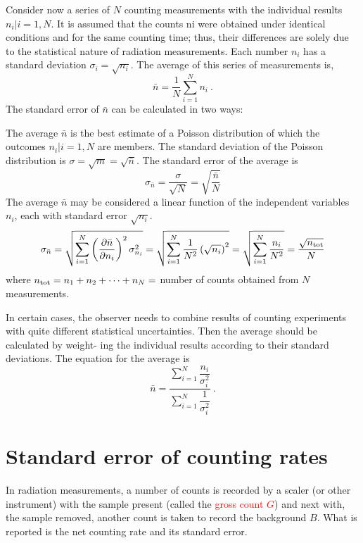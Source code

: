 \documentclass[12pt,a4paper]{article}
\begin{document}
Consider now a series of $N$ counting measurements with the individual results $n_i|i = 1, N$. It is assumed that the counts ni were obtained under identical conditions and for the same counting time; thus, their differences are solely due to the statistical nature of radiation measurements. Each number $n_i$ has a standard deviation $\sigma_i = \sqrt{n_i}$. The average of this series of measurements is,
\begin{equation}
\bar{n} = \dfrac{1}{N} \sum_{i=1}^N n_i ~.
\end{equation}
The standard error of $\bar{n}$ can be calculated in two ways:

The average $\bar{n}$ is the best estimate of a Poisson distribution of which the outcomes $n_i|i = 1, N$ are members. The standard deviation of the Poisson distribution is $\sigma = \sqrt{m} = \sqrt{\bar{n}}$. The standard error of the average is
\begin{equation}
\sigma_{\bar{n}} = \dfrac{\sigma}{\sqrt{N} } =  \sqrt{\dfrac{\bar{n} }{N} }
\end{equation}
The average $\bar{n}$ may be considered a linear function of the independent variables $n_i$, each with standard error
$\sqrt{n_i}$.
\begin{equation}
\sigma_{\bar{n}} = \sqrt{\sum_{i=1}^N \left( \dfrac{\partial \bar{n} }{\partial n_i} \right)^2 \sigma^2_{n_i} } = \sqrt{\sum_{i=1}^N \dfrac{1}{N^2} \left( \sqrt{n_i} \right)^2 } = \sqrt{\sum_{i=1}^N \dfrac{n_i}{N^2} } = \dfrac{\sqrt{n_{\rm tot}} }{N}
\end{equation}
where $n_{\rm tot} = n_1 + n_2 + \cdots + n_N =$ number of counts obtained from $N$ measurements.

In certain cases, the observer needs to combine results of counting experiments with quite different statistical uncertainties. Then the average should be calculated by weight- ing the individual results according to their standard deviations. The equation for the average is
\begin{equation}
\bar{n} = \dfrac{\sum\limits_{i=1}^N \dfrac{n_i}{\sigma^2_i} }{\sum\limits_{i=1}^N \dfrac{1}{\sigma^2_i} } ~.
\end{equation}

\section{Standard error of counting rates}
In radiation measurements, a number of counts is recorded by a scaler (or other instrument) with the sample present (called the \textcolor{red}{gross count $G$}) and next with, the sample removed, another count is taken to record the background $B$. What is reported is the net counting rate and its standard error.
\end{document}
